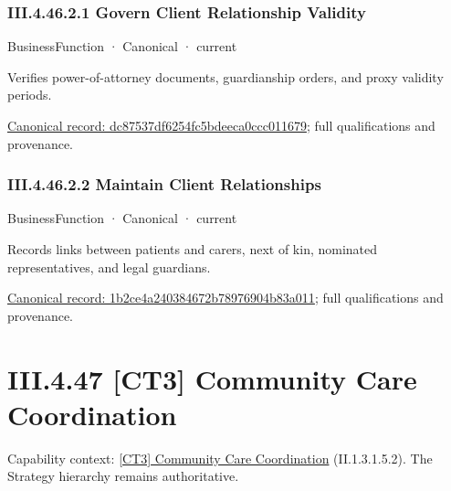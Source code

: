 \subsubsection*{III.4.46.2.1 Govern Client Relationship Validity}
\label{navigation:III.4.46.2.1}

\label{element:dc87537df6254fc5bdeeca0ccc011679}
{\small BusinessFunction · Canonical · current}\par

Verifies power-of-attorney documents, guardianship orders, and proxy validity periods.


{\footnotesize \href{../../../../continuum/business/business-function/dc87537df6254fc5bdeeca0ccc011679.md}{Canonical record: dc87537df6254fc5bdeeca0ccc011679}; full qualifications and provenance.}\par
\subsubsection*{III.4.46.2.2 Maintain Client Relationships}
\label{navigation:III.4.46.2.2}

\label{element:1b2ce4a240384672b78976904b83a011}
{\small BusinessFunction · Canonical · current}\par

Records links between patients and carers, next of kin, nominated representatives, and legal guardians.


{\footnotesize \href{../../../../continuum/business/business-function/1b2ce4a240384672b78976904b83a011.md}{Canonical record: 1b2ce4a240384672b78976904b83a011}; full qualifications and provenance.}\par
\section*{III.4.47 [CT3] Community Care Coordination}
\label{navigation:III.4.47}

{\small Capability context: \hyperref[element:8c8c6266d9ed43e09dbe44fcdd669132]{[CT3] Community Care Coordination} (II.1.3.1.5.2). The Strategy hierarchy remains authoritative.}\par
